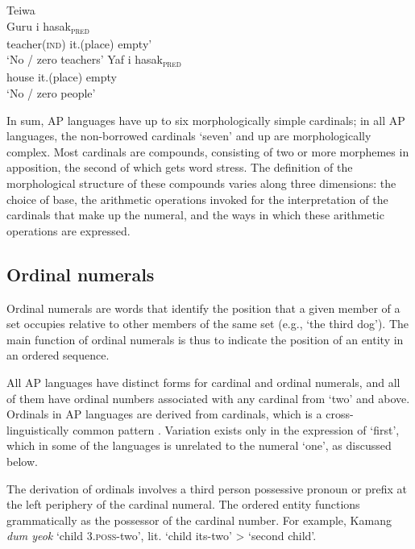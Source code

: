 \ea%
\label{bkm:Ref355363568}
{\upshape Teiwa}\\
\ea
\label{ex:8:1234}
\gll Guru       {\ob}i       hasak{\cb}\textsubscript{\textsc{pred}} \\  
     teacher\textsc{(ind)}   it.(place)    empty'  \\
\glt  `No / zero teachers' 
\ex
\gll Yaf {\ob}i     hasak{\cb}\textsubscript{\textsc{pred}} \\
    house      it.(place)   empty\\
\glt    `No / zero people' 
\z
\z

In sum, AP languages have up to six morphologically simple cardinals; in all AP languages, the non-borrowed cardinals `seven' and up are morphologically complex. Most cardinals are compounds, consisting of two or more morphemes in apposition, the second of which gets word stress. The definition of the morphological structure of these compounds varies along three dimensions: the choice of base, the arithmetic operations invoked for the interpretation of the cardinals that make up the numeral, and the ways in which these arithmetic operations are expressed. 

\subsection{Ordinal  numerals}
\label{sec:8:Ordinal}
Ordinal numerals are words that identify the position that a given member of a set occupies relative to other members of the same set (e.g., `the third dog'). The main function of ordinal numerals is thus to indicate the position of an entity in an ordered sequence. 

All AP languages have distinct forms for cardinal and ordinal numerals, and all of them have ordinal numbers associated with any cardinal from `two' and above. Ordinals in AP languages are derived from cardinals, which is a cross-linguistically common pattern \citep{StolzEtAl2013}. Variation exists only in the expression of `first', which in some of the languages is unrelated to the numeral `one', as discussed below. 

The derivation of ordinals involves a third person possessive pronoun or prefix at the left periphery of the cardinal numeral. The ordered entity functions grammatically as the possessor of the cardinal number. For example, Kamang \textit{dum yeok} `child 3.\textsc{poss}{}-two', lit. `child its-two' {\textgreater} `second child'. 

